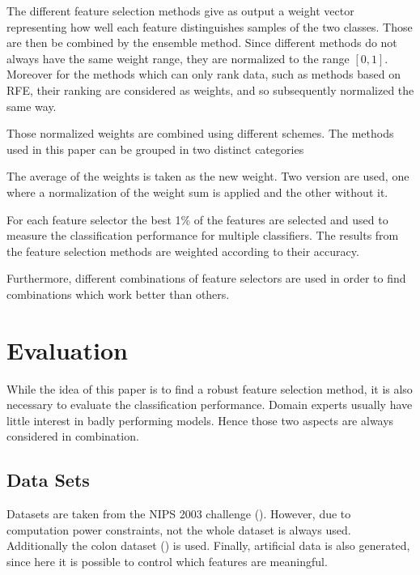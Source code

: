 \documentclass[twoside,11pt]{article}
\begin{document}
The different feature selection methods give as output a weight vector representing how well each feature distinguishes samples of the two classes. Those are then be combined by the ensemble method. Since different methods do not always have the same weight range, they are normalized to the range $[0,1]$. Moreover for the methods which can only rank data, such as methods based on RFE, their ranking are considered as weights, and so subsequently normalized the same way. 

Those normalized weights are combined using different schemes. The methods used in this paper can be grouped in two distinct categories 

\begin{description}[align=left]
\item [Linear aggregation :] The average of the weights is taken as the new weight. Two version are used, one where a normalization of the weight sum is applied and the other without it.

\item [Performance related aggregation :] For each feature selector the best 1\% of the features are selected and used to measure the classification performance for multiple classifiers. The results from the feature selection methods are weighted according to their accuracy.
\end{description}

Furthermore, different combinations of feature selectors are used in order to find combinations which work better than others.

\section{Evaluation}

While the idea of this paper is to find a robust feature selection method, it is also necessary to evaluate the classification performance. Domain experts usually have little interest in badly performing models. Hence those two aspects are always considered in combination.

\subsection{Data Sets}
Datasets are taken from the NIPS 2003 challenge (\cite{NIPS}). However, due to computation power constraints, not the whole dataset is always used. Additionally the colon dataset (\cite{alon1999broad}) is used. Finally, artificial data is also generated, since here it is possible to control which features are meaningful. 
\end{document}
